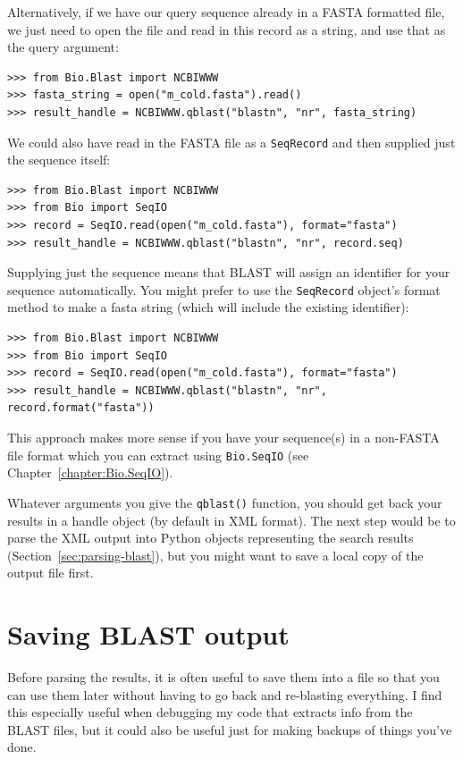 \documentclass{report}
\begin{document}
Alternatively, if we have our query sequence already in a FASTA formatted
file, we just need to open the file and read in this record as a string,
and use that as the query argument:

\begin{verbatim}
>>> from Bio.Blast import NCBIWWW
>>> fasta_string = open("m_cold.fasta").read()
>>> result_handle = NCBIWWW.qblast("blastn", "nr", fasta_string)
\end{verbatim}

We could also have read in the FASTA file as a \verb|SeqRecord| and then
supplied just the sequence itself:

\begin{verbatim}
>>> from Bio.Blast import NCBIWWW
>>> from Bio import SeqIO
>>> record = SeqIO.read(open("m_cold.fasta"), format="fasta")
>>> result_handle = NCBIWWW.qblast("blastn", "nr", record.seq)
\end{verbatim}

Supplying just the sequence means that BLAST will assign an identifier
for your sequence automatically.  You might prefer to use the
\verb|SeqRecord| object's format method to make a fasta string
(which will include the existing identifier):

\begin{verbatim}
>>> from Bio.Blast import NCBIWWW
>>> from Bio import SeqIO
>>> record = SeqIO.read(open("m_cold.fasta"), format="fasta")
>>> result_handle = NCBIWWW.qblast("blastn", "nr", record.format("fasta"))
\end{verbatim}

This approach makes more sense if you have your sequence(s) in a
non-FASTA file format which you can extract using \verb|Bio.SeqIO|
(see Chapter~\ref{chapter:Bio.SeqIO}).

Whatever arguments you give the \verb|qblast()| function, you should
get back your results in a handle object (by default in XML format).
The next step would be to parse the XML output into Python objects
representing the search results (Section~\ref{sec:parsing-blast}),
but you might want to save a local copy of the output file first.

\section{Saving BLAST output}
\label{sec:saving-blast-output}

Before parsing the results, it is often useful to save them into a
file so that you can use them later without having to go back and
re-blasting everything. I find this especially useful when debugging my
code that extracts info from the BLAST files, but it could also be
useful just for making backups of things you've done.
\end{document}

